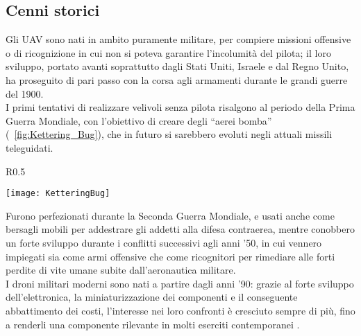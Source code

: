 \subsection[Cenni storici]{Cenni storici}
Gli UAV sono nati in ambito puramente militare, per compiere missioni offensive o di ricognizione in cui non si poteva garantire l'incolumità del pilota; il loro sviluppo, portato avanti soprattutto dagli Stati Uniti, Israele e dal Regno Unito, ha proseguito di pari passo con la corsa agli armamenti durante le grandi guerre del 1900. \\
I primi tentativi di realizzare velivoli senza pilota risalgono al periodo della Prima Guerra Mondiale, con l'obiettivo di creare degli “aerei bomba” (\figurename\ \ref{fig:Kettering_Bug}), che in futuro si sarebbero evoluti negli attuali missili teleguidati. 

\begin{wrapfigure}{R}{0.5\textwidth}
	\begin{center}
		\texttt{[image: KetteringBug]}
	\end{center}
	\caption{Kettering Bug, uno dei primi prototipi di UAV militare, 1918.} \label{fig:Kettering_Bug}
\end{wrapfigure}

Furono perfezionati durante la Seconda Guerra Mondiale, e usati anche come bersagli mobili per addestrare gli addetti alla difesa contraerea, mentre conobbero un forte sviluppo durante i conflitti successivi agli anni '50, in cui vennero impiegati sia come armi offensive che come ricognitori per rimediare alle forti perdite di vite umane subite dall'aeronautica militare.  \\
I droni militari moderni sono nati a partire dagli anni '90: grazie al forte sviluppo dell'elettronica, la miniaturizzazione dei componenti e il conseguente abbattimento dei costi, l'interesse nei loro confronti è cresciuto sempre di più, fino a renderli una componente rilevante in molti eserciti contemporanei \cite{keane2013brief}.

